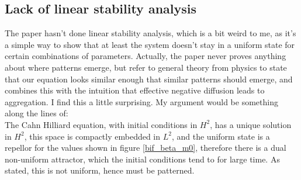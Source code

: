 \documentclass[a4paper]{jpconf}
\begin{document}
\subsection*{Lack of linear stability analysis}
The paper hasn't done linear stability analysis, which is a bit weird to me, as it's a simple way to show that at least the system doesn't stay in a uniform state for certain combinations of parameters. Actually, the paper never proves anything about where patterns emerge, but refer to general theory from physics to state that our equation looks similar enough that similar patterns should emerge, and combines this with the intuition that effective negative diffusion leads to aggregation. I find this a little surprising. My argument would be something along the lines of: \\
The Cahn Hilliard equation, with initial conditions in $H^2$, has a unique solution in $H^2$, this space is compactly embedded in $L^2$, and the uniform state is a repellor for the values shown in figure \ref{bif_beta_m0}, therefore there is a dual non-uniform attractor, which the initial conditions tend to for large time. As stated, this is not uniform, hence must be patterned. 
\end{document}
